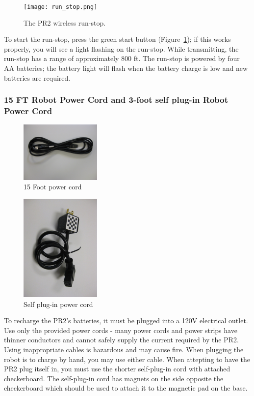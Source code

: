 \begin{figure}[ht]
\centering
\texttt{[image: run\_stop.png]}
\caption{The PR2 wireless run-stop.}
\label{fig:wirelessrunstop}
\end{figure}

To start the run-stop, press the green start button (Figure~\ref{fig:wirelessrunstop});
if this works properly, you will see a light flashing on the run-stop. While
transmitting, the run-stop has a range of approximately 800 ft. The run-stop is
powered by four AA batteries; the battery light will flash when the battery
charge is low and new batteries are required.

\subsubsection{15 FT Robot Power Cord and 3-foot self plug-in Robot Power Cord}
\begin{figure}[ht]
\centering
\includegraphics[width=150px]{images/long_plug.png}
\caption{15 Foot power cord}
\label{fig:longcord}
\end{figure}
\label{longcord}

\begin{figure}[ht]
\centering
\includegraphics[width=150px]{images/short_plug.png}
\caption{Self plug-in power cord}
\label{fig:shortcord}
\end{figure}
\label{shortcord}
To recharge the PR2's batteries, it
must be plugged into a 120V electrical outlet.  Use only the provided power
cords - many power cords and power strips have thinner conductors and cannot
safely supply the current required by the PR2.  Using inappropriate cables is
hazardous and may cause fire.  When plugging the robot is to charge by hand, you
may use either cable.  When attepting to have the PR2 plug itself in, you must
use the shorter self-plug-in cord with attached checkerboard.  The self-plug-in
cord has magnets on the side opposite the checkerboard which should be used to
attach it to the magnetic pad on the base.

